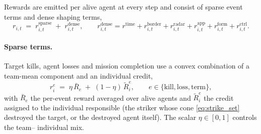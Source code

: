 Rewards are emitted per alive agent at every step and consist of sparse event
terms and dense shaping terms,
\begin{equation}
r_{i,t} \;=\; r_{i,t}^{\mathrm{sparse}} \;+\; r_{i,t}^{\mathrm{dense}},
\qquad
r_{i,t}^{\mathrm{dense}} = r^{\mathrm{time}} + r_{i,t}^{\mathrm{border}}
+ r_{i,t}^{\mathrm{radar}} + r_{i,t}^{\mathrm{app}} + r_{i,t}^{\mathrm{form}}
+ r_{i,t}^{\mathrm{ctrl}}.
\label{eq:reward_total}
\end{equation}

\paragraph{Sparse terms.}
Target kills, agent losses and mission completion use a convex combination of
a team-mean component and an individual credit,
\begin{equation}
r_i^{e} \;=\; \eta\,\bar R_e \;+\; (1-\eta)\,\tilde R_i^{e},\qquad e\in\{\mathrm{kill},\mathrm{loss},\mathrm{term}\},
\label{eq:sparse}
\end{equation}
with $\bar R_e$ the per-event reward averaged over alive agents and
$\tilde R_i^{e}$ the credit assigned to the individual responsible (the
striker whose cone \eqref{eq:strike_set} destroyed the target, or the
destroyed agent itself). The scalar $\eta\in[0,1]$ controls the team--
individual mix.

